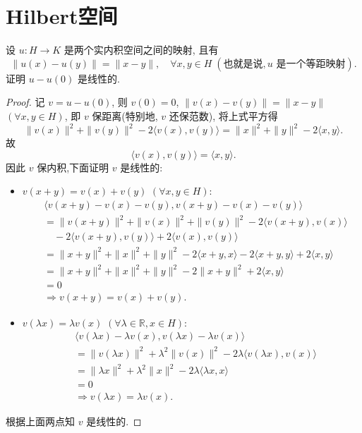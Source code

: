 \setcounter{chapter}{3}
\chapter{Hilbert空间}



\begin{exercise}
    设 $u:H\to K$ 是两个实内积空间之间的映射, 且有
    \[\|u(x)-u(y)\|=\|x-y\|,\quad\forall x,y\in H\;(\text{也就是说}, u\text{\ 是一个等距映射}).\]
    证明 $u-u(0)$ 是线性的.
\end{exercise}

\begin{proof}
记 $v=u-u(0)$, 则 $v(0)=0$, $\|v(x)-v(y)\|=\|x-y\|$ $(\forall x,y\in H)$,
即 $v$ 保距离(特别地, $v$ 还保范数), 将上式平方得 
\[\|v(x)\|^2+\|v(y)\|^2-2\langle v(x),v(y)\rangle=\|x\|^2+\|y\|^2-2\langle x,y\rangle.\]
故
\[\langle v(x),v(y)\rangle=\langle x,y\rangle.\]
因此 $v$ 保内积,下面证明 $v$ 是线性的:
\begin{itemize}
\item $v(x+y)=v(x)+v(y)$ $(\forall x,y\in H)$:
\begin{align*}
    & \langle v(x+y)-v(x)-v(y),v(x+y)-v(x)-v(y)\rangle\\
    & = \|v(x+y)\|^2+\|v(x)\|^2+\|v(y)\|^2-2\langle v(x+y),v(x)\rangle \\
    & \quad -2\langle v(x+y),v(y)\rangle+2\langle v(x),v(y)\rangle\\
    & = \|x+y\|^2+\|x\|^2+\|y\|^2-2\langle x+y,x\rangle
      -2\langle x+y,y\rangle+2\langle x,y\rangle\\
    & = \|x+y\|^2+\|x\|^2+\|y\|^2-2\|x+y\|^2+2\langle x,y\rangle\\
    & = 0 \\
    & \Rightarrow v(x+y)=v(x)+v(y).
\end{align*}
\item $v(\lambda x)=\lambda v(x)$ $(\forall\lambda\in\mathbb{R},x\in H)$:
\begin{align*}
    &\langle v(\lambda x)-\lambda v(x),v(\lambda x)-\lambda v(x)\rangle\\
    &=\|v(\lambda x)\|^2+\lambda^2\|v(x)\|^2-2\lambda\langle v(\lambda x),v(x)\rangle\\
    &=\|\lambda x\|^2+\lambda^2\|x\|^2-2\lambda\langle\lambda x,x\rangle\\
    &=0\\&\Rightarrow v(\lambda x)=\lambda v(x).
\end{align*}    
\end{itemize}
根据上面两点知 $v$ 是线性的.
\end{proof}

